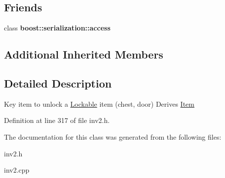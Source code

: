 \subsection*{Friends}
\begin{DoxyCompactItemize}
\item 
\hypertarget{class_key_item_ac98d07dd8f7b70e16ccb9a01abf56b9c}{}\label{class_key_item_ac98d07dd8f7b70e16ccb9a01abf56b9c} 
class {\bfseries boost\+::serialization\+::access}
\end{DoxyCompactItemize}
\subsection*{Additional Inherited Members}


\subsection{Detailed Description}
Key item to unlock a \hyperlink{class_lockable}{Lockable} item (chest, door) Derives \hyperlink{class_item}{Item} 

Definition at line 317 of file inv2.\+h.



The documentation for this class was generated from the following files\+:\begin{DoxyCompactItemize}
\item 
inv2.\+h\item 
inv2.\+cpp\end{DoxyCompactItemize}
